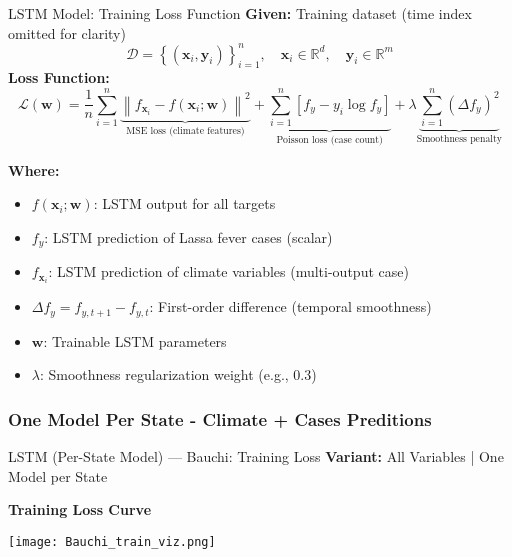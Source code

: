 \documentclass{beamer}
\begin{document}
\begin{frame}{LSTM Model: Training Loss Function}
\textbf{Given:} Training dataset (time index omitted for clarity)
\[
\mathcal{D} = \left\{ (\mathbf{x}_i, \mathbf{y}_i) \right\}_{i=1}^{n}, 
\quad \mathbf{x}_i \in \mathbb{R}^d,\quad \mathbf{y}_i \in \mathbb{R}^m
\]
\small
\textbf{Loss Function:}
\[
\mathcal{L}(\mathbf{w}) = 
\frac{1}{n} \sum_{i=1}^{n} \underbrace{\left\| f_{\mathbf{x}_i} - f(\mathbf{x}_i; \mathbf{w}) \right\|^2}_{\text{MSE loss (climate features)}}
+ \underbrace{ \sum_{i=1}^{n} \left[ f_y - y_i \log f_y \right]}_{\text{Poisson loss (case count)}}
+ \lambda \underbrace{\sum_{i=1}^{n} \left( \Delta f_y \right)^2}_{\text{Smoothness penalty}}
\]

\footnotesize
\textbf{Where:}
\begin{itemize}
    \item[] \( f(\mathbf{x}_i; \mathbf{w}) \): LSTM output for all targets
    \item[] \( f_y \): LSTM prediction of Lassa fever cases (scalar)
    \item[] \( f_{\mathbf{x}_i} \): LSTM prediction of climate variables (multi-output case)
    \item[] \( \Delta f_y = f_{y, t+1} - f_{y, t} \): First-order difference (temporal smoothness)
    \item[] \( \mathbf{w} \): Trainable LSTM parameters
    \item[] \( \lambda \): Smoothness regularization weight (e.g., 0.3)
\end{itemize}
\end{frame}



\subsubsection{One Model Per State - Climate + Cases Preditions}

\begin{frame}{LSTM (Per-State Model) — Bauchi: Training Loss}
\textbf{Variant:} All Variables | One Model per State
\vspace{0.5em}

\textbf{Training Loss Curve}
\begin{center}
    \texttt{[image: Bauchi\_train\_viz.png]}
\end{center}
\end{frame}
\end{document}
